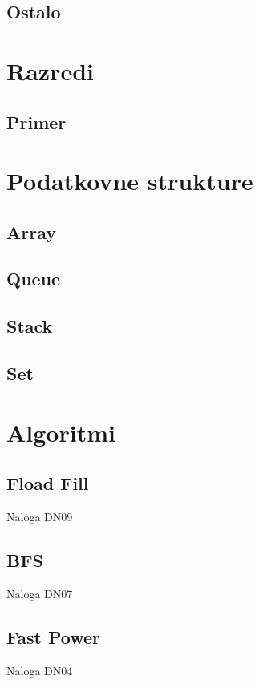 \documentclass[a4paper,oneside,12pt]{article}
\theoremstyle{definition}
\begin{document}
		\subsection{Ostalo}

\section{Razredi}
	\subsection{Primer}

\section{Podatkovne strukture}
	\subsection{Array}
	\subsection{Queue}
	\subsection{Stack}
	\subsection{Set}

\section{Algoritmi}
	\subsection{Fload Fill}
		Naloga DN09\\
	\subsection{BFS}
		Naloga DN07\\
	\subsection{Fast Power}
		Naloga DN04\\
\end{document}
